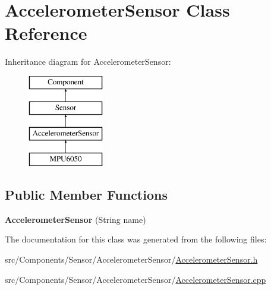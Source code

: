 \hypertarget{classAccelerometerSensor}{}\section{Accelerometer\+Sensor Class Reference}
\label{classAccelerometerSensor}
Inheritance diagram for Accelerometer\+Sensor\+:\begin{figure}[H]
\begin{center}
\leavevmode
\includegraphics[height=4.000000cm]{classAccelerometerSensor}
\end{center}
\end{figure}
\subsection*{Public Member Functions}
\begin{DoxyCompactItemize}
\item 
\hypertarget{classAccelerometerSensor_adbc4c5f0859658afd0a286fa4e71a944}{}{\bfseries Accelerometer\+Sensor} (String name)\label{classAccelerometerSensor_adbc4c5f0859658afd0a286fa4e71a944}

\end{DoxyCompactItemize}


The documentation for this class was generated from the following files\+:\begin{DoxyCompactItemize}
\item 
src/\+Components/\+Sensor/\+Accelerometer\+Sensor/\hyperlink{AccelerometerSensor_8h}{Accelerometer\+Sensor.\+h}\item 
src/\+Components/\+Sensor/\+Accelerometer\+Sensor/\hyperlink{AccelerometerSensor_8cpp}{Accelerometer\+Sensor.\+cpp}\end{DoxyCompactItemize}
